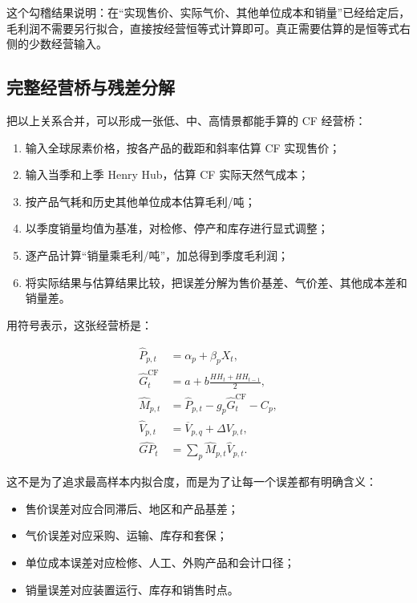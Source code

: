 \documentclass[11pt,a4paper]{ctexart}
\begin{document}
这个勾稽结果说明：在“实现售价、实际气价、其他单位成本和销量”已经给定后，毛利润不需要另行拟合，直接按经营恒等式计算即可。真正需要估算的是恒等式右侧的少数经营输入。

\subsection{完整经营桥与残差分解}

把以上关系合并，可以形成一张低、中、高情景都能手算的 CF 经营桥：

\begin{enumerate}
  \item 输入全球尿素价格，按各产品的截距和斜率估算 CF 实现售价；
  \item 输入当季和上季 Henry Hub，估算 CF 实际天然气成本；
  \item 按产品气耗和历史其他单位成本估算毛利/吨；
  \item 以季度销量均值为基准，对检修、停产和库存进行显式调整；
  \item 逐产品计算“销量乘毛利/吨”，加总得到季度毛利润；
  \item 将实际结果与估算结果比较，把误差分解为售价基差、气价差、其他成本差和销量差。
\end{enumerate}

用符号表示，这张经营桥是：

\begin{align*}
\widehat{P}_{p,t} &= \alpha_p+\beta_pX_t, \\
\widehat{G}^{\text{CF}}_t &= a+b\frac{HH_t+HH_{t-1}}{2}, \\
\widehat{M}_{p,t} &= \widehat{P}_{p,t}-g_p\widehat{G}^{\text{CF}}_t-C_p, \\
\widehat{V}_{p,t} &= \overline{V}_{p,q}+\Delta V_{p,t}, \\
\widehat{GP}_t &= \sum_p\widehat{M}_{p,t}\widehat{V}_{p,t}.
\end{align*}

这不是为了追求最高样本内拟合度，而是为了让每一个误差都有明确含义：

\begin{itemize}
  \item 售价误差对应合同滞后、地区和产品基差；
  \item 气价误差对应采购、运输、库存和套保；
  \item 单位成本误差对应检修、人工、外购产品和会计口径；
  \item 销量误差对应装置运行、库存和销售时点。
\end{itemize}
\end{document}
